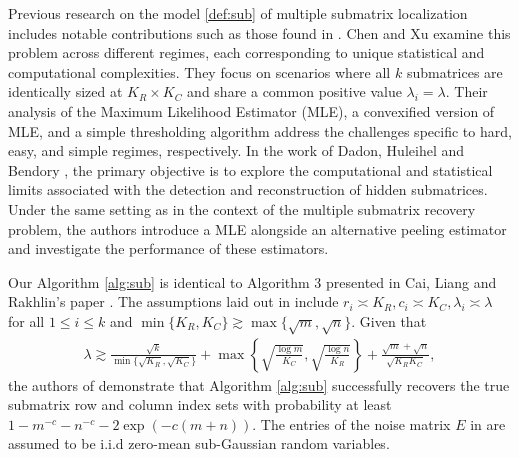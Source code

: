 \documentclass[reqno]{amsart}
\theoremstyle{plain}
\theoremstyle{definition}
\begin{document}
Previous research on the model \eqref{def:sub} of multiple submatrix localization includes notable contributions such as those found in \cite{CX16, CLR17, DHB23}.  Chen and Xu \cite{CX16} examine this problem across different regimes, each corresponding to unique statistical and computational complexities. They focus on scenarios where all $k$ submatrices are identically sized at $K_R \times K_C$ and share a common positive value $\lambda_i = \lambda$. Their analysis of the Maximum Likelihood Estimator (MLE), a convexified version of MLE, and a simple thresholding algorithm address the challenges specific to hard, easy, and simple regimes, respectively. In the work of Dadon, Huleihel and Bendory \cite{DHB23}, the primary objective is to explore the computational and statistical limits associated with the detection and reconstruction of hidden submatrices. Under the same setting as \cite{CX16} in the context of the multiple submatrix recovery problem, the authors introduce a MLE alongside an alternative peeling estimator and investigate the performance of these estimators.%

Our Algorithm \ref{alg:sub} is identical to Algorithm 3 presented in Cai, Liang and Rakhlin's paper \cite{CLR17}. The assumptions laid out in \cite{CLR17} include $r_i \asymp K_R, c_i \asymp K_C, \lambda_i \asymp \lambda$ for all  $1 \le i \le k$ and $\min\{ K_R, K_C \}\gtrsim \max\{\sqrt m, \sqrt n \}$. Given that 
\begin{align}\label{assump:clr}
\lambda \gtrsim \frac{\sqrt k}{\min\{\sqrt{K_R}, \sqrt{K_C}\}} + \max\left\{\sqrt{\frac{\log m}{K_C}}, \sqrt{\frac{\log n}{K_R} }\right\} + \frac{\sqrt m + \sqrt n}{\sqrt{K_R K_C}},
\end{align}
 the authors of \cite{CLR17} demonstrate that Algorithm \ref{alg:sub} successfully recovers the true submatrix row and column index sets with probability at least $1-m^{-c} - n^{-c} -2 \exp(-c(m+n)).$ The entries of the noise matrix $E$ in \cite{CLR17} are assumed to be i.i.d zero-mean sub-Gaussian random variables. 
\end{document}
